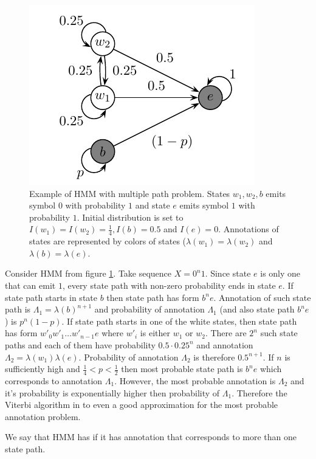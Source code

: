 \begin{figure}
\begin{center}
\includegraphics{../figures/multiplePathProblemHMM.pdf}
\end{center}
\caption[Hidden Markov Model with multiple path problem.]{Example of HMM with
multiple path problem. States $w_1,w_2,b$ emits symbol $0$ with probability $1$
and state $e$ emits symbol $1$ with probability $1$. Initial distribution is set
to $I(w_1)=I(w_2)=\frac14, I(b)=0.5$
and $I(e)=0$. Annotations of states are represented by colors of states
($\lambda(w_1)=\lambda(w_2)$ and $\lambda(b)=\lambda(e)$. }\label{FIGURE:BADVITERBIEXAMPLE}
\end{figure}

\begin{example}
Consider HMM from figure \ref{FIGURE:BADVITERBIEXAMPLE}. Take sequence $X=0^n1$.
Since state $e$ is only one that can emit $1$, every state path with non-zero
probability ends in state $e$. If state path starts in state $b$ then state
path has form $b^ne$. Annotation of such state path is $\Lambda_1=\lambda(b)^{n+1}$
and probability of annotation $\Lambda_1$ (and also state path $b^ne$) is $p^n(1-p)$.
If state path starts in one of the white states, then state path
has form $w'_0w'_1\dots w'_{n-1}e$ where $w'_i$ is either $w_1$ or $w_2$.
There are $2^n$ such state paths and each of them have probability $0.5\cdot
0.25^n$ and annotation $\Lambda_2=\lambda(w_1)\lambda(e)$. Probability of
annotation $\Lambda_2$ is therefore $0.5^{n+1}$.
If $n$ is sufficiently high and $\frac14<p<\frac12$ then most probable state
path is $b^ne$ which corresponds to annotation $\Lambda_1$. However, the most
probable annotation is $\Lambda_2$ and it's probability is exponentially higher
then probability of $\Lambda_1$. Therefore the Viterbi algorithm in to even a
good approximation for the most probable annotation problem.

We say that HMM has  if it has annotation that
corresponds to more than one state path.
\end{example}

